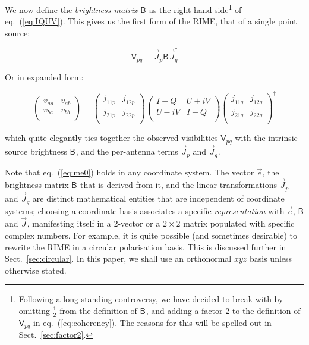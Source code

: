 \documentclass[]{aa}
\newcommand{\jones}[2]{\vec {#1}_{#2}}
\newcommand{\jonesT}[2]{\vec {#1}^\dagger_{#2}}
\newcommand{\coh}[2]{\mathsf{{#1}}_{{#2}}}
\begin{document}
We now define the {\em brightness matrix} $\coh{B}{}$ as the right-hand side\footnote{Following a long-standing controversy, we have decided to break with \citet{ME4} by omitting $\frac{1}{2}$ from the definition of $\coh{B}{}$, and adding a factor 2 to the definition of $\coh{V}{pq}$ in eq.~(\ref{eq:coherency}). The reasons for this will be spelled out in Sect.~\ref{sec:factor2}.} of eq.~(\ref{eq:IQUV}). This gives us the first form of the RIME, that of a single point source:

    \begin{equation}\label{eq:me0}
    \coh{V}{pq} = \jones{J}{p} \coh{B}{}  \jonesT{J}{q}
    \end{equation}

Or in expanded form:

\[
    \left( 
    \begin{array}{cc}
    v_{aa} & v_{ab} \\
    v_{ba} & v_{bb} \\
    \end{array}
    \right) = 
    \left( 
    \begin{array}{cc}
    j_{11p} & j_{12p} \\
    j_{21p} & j_{22p} \\
    \end{array}
    \right) 
    \left( 
    \begin{array}{cc}
    I+Q & U+iV \\
    U-iV & I-Q \\
    \end{array}
    \right) 
    \left( 
    \begin{array}{cc}
    j_{11q} & j_{12q} \\
    j_{21q} & j_{22q} \\
    \end{array}
    \right)^\dagger
\]

which quite elegantly ties together the observed visibilities $\coh{V}{pq}$ with the intrinsic source brightness $\coh{B}{}$, and the per-antenna terms $\jones{J}{p}$ and $\jones{J}{q}$.

Note that eq.~(\ref{eq:me0}) holds in any coordinate system. The vector $\vec e$, the brightness matrix $\coh{B}{}$ that is derived from it, and the linear transformations $\jones{J}{p}$ and $\jones{J}{q}$ are distinct mathematical entities that are independent of coordinate systems; choosing a coordinate basis associates a specific {\em representation} with $\vec e$,  $\coh{B}{}$ and $\jones{J}{}$, manifesting itself in a 2-vector or a $2\times2$ matrix populated with specific complex numbers. For example, it is quite possible (and sometimes desirable) to rewrite the RIME in a circular polarisation basis. This is discussed further in Sect.~\ref{sec:circular}. In this paper, we shall use an orthonormal $xyz$ basis unless otherwise stated.
\end{document}
